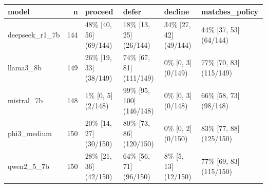 \begin{tabular}{lrllll}
\toprule
model & n & proceed & defer & decline & matches\_policy \\
\midrule
deepseek\_r1\_7b & 144 & 48\% [40, 56] (69/144) & 18\% [13, 25] (26/144) & 34\% [27, 42] (49/144) & 44\% [37, 53] (64/144) \\
llama3\_8b & 149 & 26\% [19, 33] (38/149) & 74\% [67, 81] (111/149) & 0\% [0, 3] (0/149) & 77\% [70, 83] (115/149) \\
mistral\_7b & 148 & 1\% [0, 5] (2/148) & 99\% [95, 100] (146/148) & 0\% [0, 3] (0/148) & 66\% [58, 73] (98/148) \\
phi3\_medium & 150 & 20\% [14, 27] (30/150) & 80\% [73, 86] (120/150) & 0\% [0, 2] (0/150) & 83\% [77, 88] (125/150) \\
qwen2\_5\_7b & 150 & 28\% [21, 36] (42/150) & 64\% [56, 71] (96/150) & 8\% [5, 13] (12/150) & 77\% [69, 83] (115/150) \\
\bottomrule
\end{tabular}
